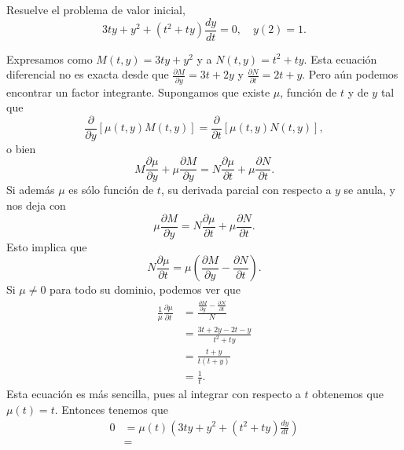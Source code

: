 Resuelve el problema de valor inicial,
\[
    3ty+y^2
    +
    \left( t^2+ty \right) \frac{dy}{dt} = 0,\quad y(2) = 1.
\]
\begin{solution}
    Expresamos como $M(t,y)=3ty+y^2$ y a \( N(t,y) = t^2 + ty \).
    Esta ecuación diferencial no es exacta desde que 
    \( \frac{\partial M}{\partial y} = 3t + 2 y \) y 
    \( \frac{\partial N}{\partial t} = 2t +y \).
    Pero aún podemos encontrar un factor integrante.
    Supongamos que existe \( \mu \), función de \( t \) y de \( y \) tal que
    \[
        \frac{\partial}{\partial y } 
        \left[ 
            \mu(t,y)
            M(t,y)
        \right] 
        =
        \frac{\partial}{\partial t} 
        \left[ 
            \mu(t,y)N(t,y)
        \right],
    \]
    o bien 
    \[
        M
        \frac{\partial \mu}{\partial y} +
        \mu
        \frac{\partial M}{\partial y} 
        =
        N
        \frac{\partial \mu}{\partial t} 
        +
        \mu
        \frac{\partial N}{\partial t}.
    \]
    Si además $\mu$ es sólo función de $t$, su derivada parcial con respecto a
    \( y \) se anula, y nos deja con
    \[
        \mu
        \frac{\partial M}{\partial y} 
        =
        N
        \frac{\partial \mu}{\partial t} 
        +
        \mu
        \frac{\partial N}{\partial t}.
    \]
    Esto implica que 
    \[
        N \frac{\partial \mu}{\partial t} 
        =
        \mu 
        \left( 
            \frac{\partial M}{\partial y} 
            -
            \frac{\partial N}{\partial t} 
        \right).
    \]
    Si $\mu\neq 0$ para todo su dominio,  podemos ver que 
    \begin{align*}
        \frac{1}{\mu} \frac{\partial \mu}{\partial t} 
        &=
        \frac{
            \frac{\partial M}{\partial y} 
            -
            \frac{\partial N}{\partial t} 
        }{N}\\
        &=
        \frac{
            3t+2y-2t-y
        }{t^2+ty} \\
        &=
        \frac{t+y}{t(t+y)} \\
        &=
        \frac{1}{t}.
    \end{align*}
    Esta ecuación es más sencilla, pues al integrar con respecto a $t$ obtenemos que 
    \(
        \mu(t)
        =
        t.
    \)
    Entonces tenemos que 
    \begin{align*}
        0
        &=
        \mu(t)
        \left( 
        3ty+y^2
        +
        ( t^2 + ty ) 
        \frac{dy}{dt}
        \right) \\
        &=

\end{align*}
\end{solution}
